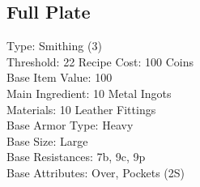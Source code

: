 \subsection{Full Plate}\label{recipe:fullPlate}
Type: Smithing (3)\\
Threshold: 22
Recipe Cost: 100 Coins\\
Base Item Value: 100\\
Main Ingredient: 10 Metal Ingots\\
Materials: 10 Leather Fittings\\
Base Armor Type: Heavy\\
Base Size: Large\\
Base Resistances: 7b, 9c, 9p\\
Base Attributes: Over, Pockets (2S)\\
